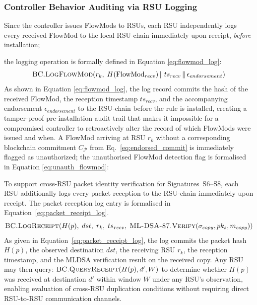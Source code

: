 \documentclass[12pt, a4paper]{report}
\begin{document}
\subsubsection{Controller Behavior Auditing via RSU Logging}
Since the controller issues FlowMods to RSUs, each RSU independently
logs every received FlowMod to the local RSU-chain immediately upon
receipt, \emph{before} installation;
{the logging operation is formally defined in
Equation \eqref{eq:flowmod_log}:
\begin{equation}
\textsc{BC.LogFlowMod}\!\left(r_k,\;
H(\text{FlowMod}_{recv}) \,\|\, ts_{recv} \,\|\,
\epsilon_{endorsement}\right)
\label{eq:flowmod_log}
\end{equation}
As shown in Equation \eqref{eq:flowmod_log}, the log record
commits the hash of the received FlowMod, the reception timestamp
$ts_{recv}$, and the accompanying endorsement $\epsilon_{endorsement}$
to the RSU-chain before the rule is installed, creating a
tamper-proof pre-installation audit trail that makes it impossible
for a compromised controller to retroactively alter the record of
which FlowMods were issued and when.
A FlowMod arriving at RSU $r_k$ without a corresponding blockchain
commitment $C_{\mathcal{P}}$ from Eq.~\eqref{eq:endorsed_commit}
is immediately flagged as unauthorized;
the unauthorised FlowMod detection flag is formalised in
Equation \eqref{eq:unauth_flowmod}:

To support cross-\ac{RSU} packet identity verification
for Signatures~S6--S8, each \ac{RSU} additionally logs
every packet reception to the \ac{RSU}-chain immediately
upon receipt. The packet reception log entry is formalised
in Equation~\eqref{eq:packet_receipt_log}.
\begin{equation}
\textsc{BC.LogReceipt}\!\left(
H(p),\; dst,\; r_k,\; ts_{recv},\;
\textsc{ML-DSA-87.Verify}(\sigma_{copy},pk_s,m_{copy})
\right)
\label{eq:packet_receipt_log}
\end{equation}
As given in Equation~\eqref{eq:packet_receipt_log},
the log commits the packet hash $H(p)$, the observed
destination $dst$, the receiving \ac{RSU} $r_k$, the
reception timestamp, and the \ac{MLDSA} verification
result on the received copy. Any \ac{RSU} may then
query: $\textsc{BC.QueryReceipt}(H(p), d', W)$ to
determine whether $H(p)$ was received at destination
$d'$ within window $W$ under any \ac{RSU}'s
observation, enabling evaluation of cross-\ac{RSU}
duplication conditions without requiring direct
\ac{RSU}-to-\ac{RSU} communication channels.


}
\end{document}
